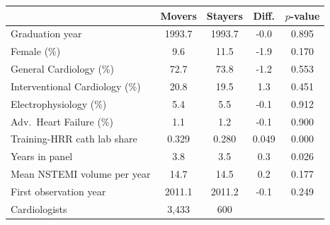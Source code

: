 \begin{tabular}{lcccc}
\toprule
 & Movers & Stayers & Diff. & $p$-value \\
\midrule
Graduation year & 1993.7 & 1993.7 & -0.0 & 0.895 \\
Female (\%) & 9.6 & 11.5 & -1.9 & 0.170 \\
General Cardiology (\%) & 72.7 & 73.8 & -1.2 & 0.553 \\
Interventional Cardiology (\%) & 20.8 & 19.5 & 1.3 & 0.451 \\
Electrophysiology (\%) & 5.4 & 5.5 & -0.1 & 0.912 \\
Adv.\ Heart Failure (\%) & 1.1 & 1.2 & -0.1 & 0.900 \\
Training-HRR cath lab share & 0.329 & 0.280 & 0.049 & 0.000 \\
Years in panel & 3.8 & 3.5 & 0.3 & 0.026 \\
Mean NSTEMI volume per year & 14.7 & 14.5 & 0.2 & 0.177 \\
First observation year & 2011.1 & 2011.2 & -0.1 & 0.249 \\
\midrule
Cardiologists & 3,433 & 600 &  &  \\
\bottomrule
\end{tabular}

